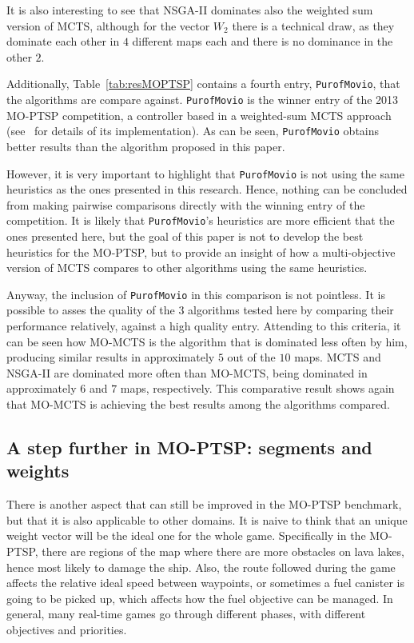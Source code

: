 \documentclass[journal]{IEEEtran}
\begin{document}
It is also interesting to see that NSGA-II dominates also the weighted sum version of MCTS, although for the vector $W_2$ there is a technical draw, as they dominate each other in $4$ different maps each and there is no dominance in the other $2$.

Additionally, Table~\ref{tab:resMOPTSP} contains a fourth entry, \texttt{PurofMovio}, that the algorithms are compare against. \texttt{PurofMovio} is the winner entry of the 2013 MO-PTSP competition, a controller based in a weighted-sum MCTS approach (see~\cite{Powley2013} for details of its implementation). As can be seen, \texttt{PurofMovio} obtains better results than the algorithm proposed in this paper.

However, it is very important to highlight that \texttt{PurofMovio} is not using the same heuristics as the ones presented in this research. Hence, nothing can be concluded from making pairwise comparisons directly with the winning entry of the competition. It is likely that \texttt{PurofMovio}'s heuristics are more efficient that the ones presented here, but the goal of this paper is not to develop the best heuristics for the MO-PTSP, but to provide an insight of how a multi-objective version of MCTS compares to other algorithms using the same heuristics.

Anyway, the inclusion of \texttt{PurofMovio} in this comparison is not pointless. It is possible to asses the quality of the $3$ algorithms tested here by comparing their performance relatively, against a high quality entry. Attending to this criteria, it can be seen how MO-MCTS is the algorithm that is dominated less often by him, producing similar results in approximately $5$ out of the $10$ maps. MCTS and NSGA-II are dominated more often than MO-MCTS, being dominated in approximately $6$ and $7$ maps, respectively. This comparative result shows again that MO-MCTS is achieving the best results among the algorithms compared.

\subsection{A step further in MO-PTSP: segments and weights} \label{ssec:resVarW}

There is another aspect that can still be improved in the MO-PTSP benchmark, but that it is also applicable to other domains. It is naive to think that an unique weight vector will be the ideal one for the whole game. Specifically in the MO-PTSP, there are regions of the map where there are more obstacles on lava lakes, hence most likely to damage the ship. Also, the route followed during the game affects the relative ideal speed between waypoints, or sometimes a fuel canister is going to be picked up, which affects how the fuel objective can be managed. In general, many real-time games go through different phases, with different objectives and priorities.
\end{document}
